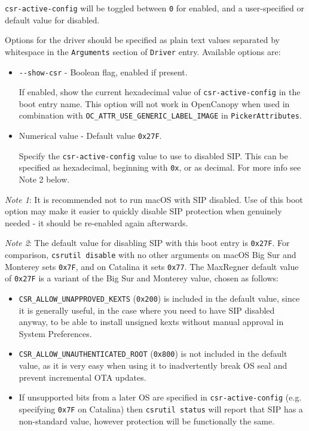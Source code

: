 \documentclass[]{article}
\providecommand{\tightlist}{%
  \setlength{\itemsep}{0pt}\setlength{\parskip}{0pt}}
\begin{document}
\texttt{csr-active-config}  will be toggled between \texttt{0} for enabled, and a user-specified or
default value for disabled.

Options for the driver should be specified as plain text values separated by whitespace in the
\texttt{Arguments} section of \texttt{Driver} entry. Available options are:

\begin{itemize}
\tightlist
  \item \texttt{-{}-show-csr} - Boolean flag, enabled if present. \medskip

  If enabled, show the current hexadecimal value of \texttt{csr-active-config} in the boot entry name.
  This option will not work in OpenCanopy when used in combination with \texttt{OC\_ATTR\_USE\_GENERIC\_LABEL\_IMAGE}
  in \texttt{PickerAttributes}. \medskip

  \item Numerical value - Default value \texttt{0x27F}. \medskip

  Specify the \texttt{csr-active-config} value to use to disabled SIP. This can be specified as
  hexadecimal, beginning with \texttt{0x}, or as decimal. For more info see Note 2 below. \medskip
\end{itemize}

\emph{Note 1}: It is recommended not to run macOS with
SIP disabled. Use of this boot option may make it easier to quickly disable SIP
protection when genuinely needed - it should be re-enabled again afterwards.

\emph{Note 2}: The default value for disabling SIP with this boot entry is \texttt{0x27F}.
For comparison, \texttt{csrutil disable} with no other arguments on macOS Big Sur and Monterey
sets \texttt{0x7F}, and on Catalina it sets \texttt{0x77}. The MaxRegner default value of \texttt{0x27F}
is a variant of the Big Sur and Monterey value, chosen as follows:
\begin{itemize}
\tightlist
\item \texttt{CSR\_ALLOW\_UNAPPROVED\_KEXTS} (\texttt{0x200}) is included in the default value,
since it is generally useful, in the case where you need to have SIP disabled anyway, to be
able to install unsigned kexts without manual approval in System Preferences.
\item \texttt{CSR\_ALLOW\_UNAUTHENTICATED\_ROOT} (\texttt{0x800}) is not included in the default
value, as it is very easy when using it to inadvertently break OS seal and prevent incremental OTA updates.
\item If unsupported bits from a later OS are specified in \texttt{csr-active-config}
(e.g. specifying \texttt{0x7F} on Catalina) then \texttt{csrutil status}
will report that SIP has a non-standard value, however protection will be functionally the same.
\end{itemize}
\end{document}
